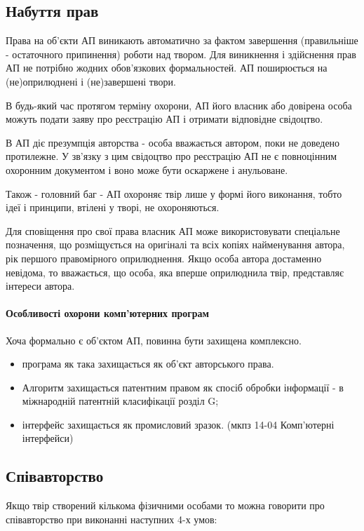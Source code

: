 \subsection{Набуття прав}
Права на об'єкти АП виникають автоматично за фактом завершення (правильніше - остаточного припинення) роботи над твором.
Для виникнення і здійснення прав АП не потрібно жодних обов'язкових формальностей. АП поширюється на (не)оприлюднені і (не)завершені твори. 

В будь-який час протягом терміну охорони, АП його власник або довірена особа можуть подати заяву про реєстрацію АП і отримати відповідне свідоцтво. 

В АП діє презумпція авторства - особа вважається автором, поки не доведено протилежне. У зв'язку з цим свідоцтво про реєстрацію АП не є повноцінним охоронним документом і воно може бути оскаржене і анульоване. 

Також - головний баг - АП охороняє твір лише у формі його виконання, тобто ідеї і принципи, втілені у творі, не охороняються.

Для сповіщення про свої права власник АП може використовувати спеціальне позначення, що розміщується на оригіналі та всіх копіях \textcopyright найменування автора, рік першого правомірного оприлюднення. Якщо особа автора достаменно невідома, то вважається, що особа, яка вперше оприлюднила твір, представляє інтереси автора.

\paragraph{Особливості охорони комп’ютерних програм}
Хоча формально є об’єктом АП, повинна бути захищена комплексно.
\begin{itemize}
	\item програма як така захищається як об’єкт авторського права.
	\item Алгоритм захищається патентним правом як спосіб обробки інформації - в міжнародній патентній класифікації розділ G;
	\item інтерфейс захищається як промисловий зразок. (мкпз 14-04 Комп’ютерні інтерфейси)
\end{itemize}
\subsection{Співавторство}
Якщо твір створений кількома фізичними особами то можна говорити про співавторство при виконанні наступних 4-х умов:

